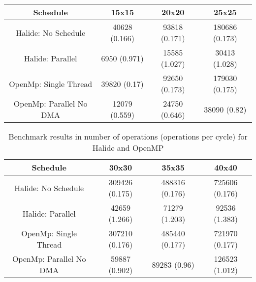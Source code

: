 \begin{table}[ht]
\begin{center}
\begin{tabular}{|c||c|c|c|}
\hline
Schedule& 15x15& 20x20& 25x25\\ 
\hline
\hline
Halide: No Schedule& 40628 (0.166)& 93818 (0.171)& 180686 (0.173)\\ 
\hline
Halide: Parallel& 6950 (0.971)& 15585 (1.027)& 30413 (1.028)\\ 
\hline
OpenMp: Single Thread& 39820 (0.17)& 92650 (0.173)& 179030 (0.175)\\ 
\hline
OpenMp: Parallel No DMA & 12079 (0.559)& 24750 (0.646)& 38090 (0.82)\\ 
\hline

\end{tabular}
\end{center}
\end{table}


\begin{table}[ht]
\begin{center}
\begin{tabular}{|c||c|c|c|}
\hline
Schedule& 30x30& 35x35& 40x40\\ 
\hline
\hline
Halide: No Schedule& 309426 (0.175)& 488316 (0.176)& 725606 (0.176)\\ 
\hline
Halide: Parallel& 42659 (1.266)& 71279 (1.203)& 92536 (1.383)\\ 
\hline
OpenMp: Single Thread& 307210 (0.176)& 485440 (0.177)& 721970 (0.177)\\ 
\hline
OpenMp: Parallel No DMA & 59887 (0.902)& 89283 (0.96)& 126523 (1.012)\\ 
\hline

\end{tabular}
\end{center}
	\caption{Benchmark results in number of operations (operations per cycle) for Halide and OpenMP}
	\label{Table:BenchmarksHalideOpenMP}
\end{table}

